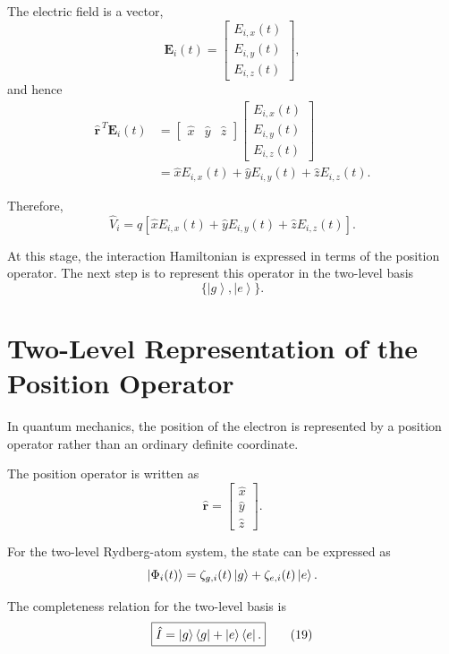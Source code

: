 \documentclass[12pt,a4paper]{article}
\newcommand{\ketg}{\left|g\right\rangle}
\newcommand{\kete}{\left|e\right\rangle}
\begin{document}
The electric field is a vector,
\[
\mathbf E_i(t)
=
\begin{bmatrix}
E_{i,x}(t)\\
E_{i,y}(t)\\
E_{i,z}(t)
\end{bmatrix},
\]
and hence
\[
\begin{aligned}
\hat{\mathbf r}^{\,T}\mathbf E_i(t)
&=
\begin{bmatrix}
\hat x&\hat y&\hat z
\end{bmatrix}
\begin{bmatrix}
E_{i,x}(t)\\
E_{i,y}(t)\\
E_{i,z}(t)
\end{bmatrix}\\
&=
\hat xE_{i,x}(t)
+
\hat yE_{i,y}(t)
+
\hat zE_{i,z}(t).
\end{aligned}
\]

Therefore,
\begin{equation}
\boxed{
\hat V_i
=
q
\left[
\hat xE_{i,x}(t)
+
\hat yE_{i,y}(t)
+
\hat zE_{i,z}(t)
\right].
}
\tag{18}
\end{equation}

At this stage, the interaction Hamiltonian is expressed in terms
of the position operator. The next step is to represent this
operator in the two-level basis
\[
\{\ketg,\kete\}.
\]

\section{Two-Level Representation of the Position Operator}

In quantum mechanics, the position of the electron is represented by
a position operator rather than an ordinary definite coordinate.

The position operator is written as
\[
\hat{\mathbf r}
=
\begin{bmatrix}
\hat x\\
\hat y\\
\hat z
\end{bmatrix}.
\]

For the two-level Rydberg-atom system, the state can be expressed as
\[
\ket{\Phi_i(t)}
=
\zeta_{g,i}(t)\ketg
+
\zeta_{e,i}(t)\kete.
\]

The completeness relation for the two-level basis is
\begin{equation}
\boxed{
\hat I
=
\ketg\bra g
+
\kete\bra e.
}
\tag{19}
\end{equation}
\end{document}
